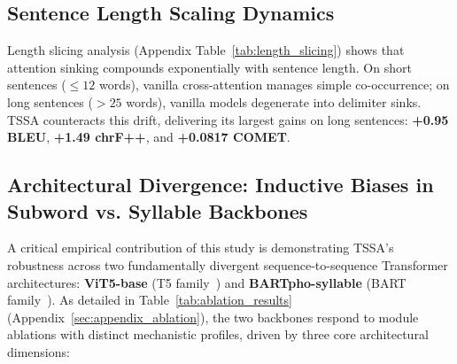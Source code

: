 \documentclass[11pt]{article}
\begin{document}
\subsection{Sentence Length Scaling Dynamics}
Length slicing analysis (Appendix Table~\ref{tab:length_slicing}) shows that attention sinking compounds exponentially with sentence length. On short sentences ($\le 12$ words), vanilla cross-attention manages simple co-occurrence; on long sentences ($>25$ words), vanilla models degenerate into delimiter sinks. TSSA counteracts this drift, delivering its largest gains on long sentences: \textbf{+0.95 BLEU}, \textbf{+1.49 chrF++}, and \textbf{+0.0817 COMET}.

\subsection{Architectural Divergence: Inductive Biases in Subword vs. Syllable Backbones}
A critical empirical contribution of this study is demonstrating TSSA's robustness across two fundamentally divergent sequence-to-sequence Transformer architectures: \textbf{ViT5-base} (T5 family~\cite{raffel2020exploring,phan2022vit5}) and \textbf{BARTpho-syllable} (BART family~\cite{lewis-etal-2020-bart,tran2021bartpho}). As detailed in Table~\ref{tab:ablation_results} (Appendix~\ref{sec:appendix_ablation}), the two backbones respond to module ablations with distinct mechanistic profiles, driven by three core architectural dimensions:
\end{document}
